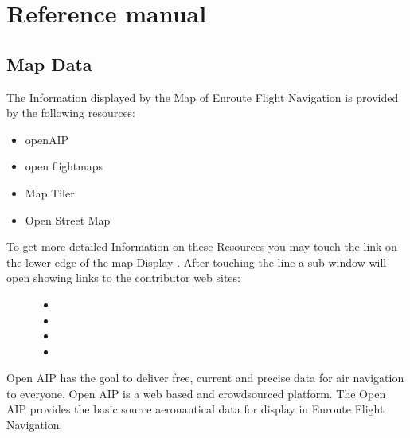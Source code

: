 \documentclass[letterpaper,10pt,english]{sphinxmanual}
\begin{document}
 \part{Reference manual}


\chapter{Map Data}
\label{\detokenize{03-reference/map_data:map-data}}\label{\detokenize{03-reference/map_data::doc}}
\sphinxAtStartPar
The Information displayed by the Map of Enroute Flight Navigation is provided by the following resources:
\begin{itemize}
\item {} 
\sphinxAtStartPar
openAIP

\item {} 
\sphinxAtStartPar
open flightmaps

\item {} 
\sphinxAtStartPar
Map Tiler

\item {} 
\sphinxAtStartPar
Open Street Map

\end{itemize}
\begin{description}
\item[{To get more detailed Information on these Resources you may touch the link on the lower edge of the map Display . After touching the line  a sub window will open showing links to the contributor web sites:}] \leavevmode\begin{itemize}
\item {} 
\sphinxAtStartPar
{}

\item {} 
\sphinxAtStartPar
{}

\item {} 
\sphinxAtStartPar
{}

\item {} 
\sphinxAtStartPar
{}

\end{itemize}

\end{description}

\sphinxAtStartPar
{}

\sphinxAtStartPar
Open AIP has the goal to deliver free, current and precise data for air navigation to everyone. Open AIP is a web based and crowd\sphinxhyphen{}sourced platform.
The Open AIP provides the basic source aeronautical data for display in Enroute Flight Navigation.
\end{document}
